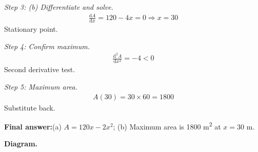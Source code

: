 \documentclass[11pt]{article}
\begin{document}
\textit{Step 3: (b) Differentiate and solve.}
\[\begin{gathered}
\frac{\mathrm{d}A}{\mathrm{d}x} = 120 - 4x = 0 \Rightarrow x = 30
\end{gathered}\]
Stationary point.

\textit{Step 4: Confirm maximum.}
\[\begin{gathered}
\frac{\mathrm{d}^2A}{\mathrm{d}x^2} = -4 < 0
\end{gathered}\]
Second derivative test.

\textit{Step 5: Maximum area.}
\[\begin{gathered}
A(30) = 30 \times 60 = 1800
\end{gathered}\]
Substitute back.

\begin{answerbox}
\textbf{Final answer:}\quad (a) \(\displaystyle  A = 120x - 2x^2 \); (b) Maximum area is 1800 m\textsuperscript{2} at \(\displaystyle  x = 30 \) m.
\end{answerbox}
\textbf{Diagram.}
\end{document}

